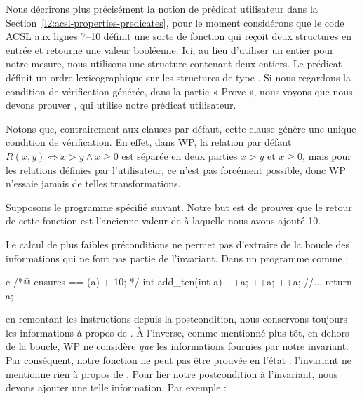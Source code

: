

Nous décrirons plus précisément la notion de prédicat utilisateur dans la
Section~\ref{l2:acsl-properties-predicates}, pour le moment considérons que le
code ACSL aux lignes 7--10 définit une sorte de fonction qui reçoit deux
structures en entrée et retourne une valeur booléenne. Ici, au lieu d'utiliser
un entier pour notre mesure, nous utilisons une structure contenant deux
entiers. Le prédicat  définit un ordre lexicographique sur
les structures de type . Si nous regardons la condition de
vérification générée, dans la partie « Prove », nous voyons que nous devons
prouver , qui utilise notre prédicat utilisateur.


Notons que, contrairement aux clauses  par défaut,
cette clause génère une unique condition de vérification. En effet, dans WP,
la relation par défaut $R(x,y) \Leftrightarrow x > y \wedge x \geq 0$ est
séparée en deux parties $x > y$ et $x \geq 0$, mais pour les relations définies
par l'utilisateur, ce n'est pas forcément possible, donc WP n'essaie jamais de
telles transformations.




Supposons le programme spécifié suivant. Notre but est de prouver que le retour
de cette fonction est l'ancienne valeur de  à laquelle nous avons ajouté 10.






Le calcul de plus faibles préconditions ne permet pas d'extraire de la boucle des
informations qui ne font pas partie de l'invariant. Dans un programme comme :
\begin{CodeBlock}{c}
/*@
    ensures \result == \old(a) + 10;
*/
int add_ten(int a){
    ++a;
    ++a;
    ++a;
    //...
    return a;
}
\end{CodeBlock}
en remontant les instructions depuis la postcondition, nous conservons toujours les
informations à propos de . À l'inverse, comme mentionné plus tôt, en dehors
de la boucle, WP ne considère \textit{que} les informations fournies par notre
invariant. Par conséquent, notre fonction  ne peut pas être prouvée
en l'état : l'invariant ne mentionne rien à propos de . Pour lier notre
postcondition à l'invariant, nous devons ajouter une telle information. Par
exemple :



